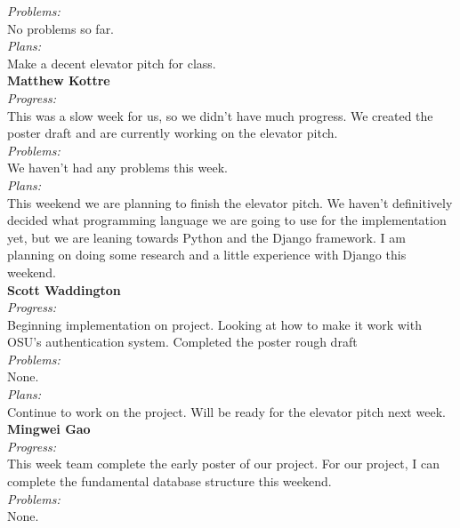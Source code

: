 \noindent\textit{Problems:}\\
\noindent No problems so far.\\

\noindent\textit{Plans:}\\
\noindent Make a decent elevator pitch for class.\\

\noindent\textbf{Matthew Kottre}\\
\noindent\textit{Progress:}\\
This was a slow week for us, so we didn't have much progress. We created the poster draft and are currently working on the elevator pitch.\\

\noindent\textit{Problems:}\\
\noindent We haven't had any problems this week.\\

\noindent\textit{Plans:}\\
\noindent This weekend we are planning to finish the elevator pitch. We haven't definitively decided what programming language we are going to use for the implementation yet, but we are leaning towards Python and the Django framework. I am planning on doing some research and a little experience with Django this weekend.\\

\noindent\textbf{Scott Waddington}\\
\noindent\textit{Progress:}\\
Beginning implementation on project. Looking at how to make it work with OSU's authentication system. Completed the poster rough draft\\

\noindent\textit{Problems:}\\
\noindent None.\\

\noindent\textit{Plans:}\\
\noindent Continue to work on the project. Will be ready for the elevator pitch next week.\\

\noindent\textbf{Mingwei Gao}\\
\noindent\textit{Progress:}\\
 This week team complete the early poster of our project. For our project, I can complete the fundamental database structure this weekend. \\

\noindent\textit{Problems:}\\
\noindent None.\\

